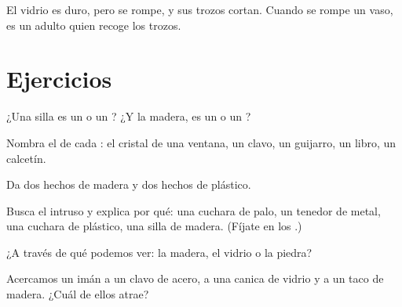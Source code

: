 \begin{remark}\label{rem:g1:materials-around-us:glass}
El vidrio es duro, pero se rompe, y sus trozos cortan. Cuando se rompe
un vaso, es un adulto quien recoge los trozos.
\end{remark}

\section{Ejercicios}

\begin{exercise}[$\star$]\label{exo:g1:materials-around-us:1}
¿Una silla es un  o un ? ¿Y la madera, es un  o un
?
\end{exercise}

\begin{exercise}[$\star$]\label{exo:g1:materials-around-us:2}
Nombra el  de cada : el cristal de una ventana, un clavo,
un guijarro, un libro, un calcetín.
\end{exercise}

\begin{exercise}[$\star$]\label{exo:g1:materials-around-us:3}
Da dos  hechos de madera y dos  hechos de plástico.
\end{exercise}

\begin{exercise}[$\star$]\label{exo:g1:materials-around-us:4}
Busca el intruso y explica por qué: una cuchara de palo, un tenedor de
metal, una cuchara de plástico, una silla de madera. (Fíjate en los
.)
\end{exercise}

\begin{exercise}[$\star$]\label{exo:g1:materials-around-us:5}
¿A través de qué  podemos ver: la madera, el vidrio o la
piedra?
\end{exercise}

\begin{exercise}[$\star$]\label{exo:g1:materials-around-us:6}
Acercamos un imán a un clavo de acero, a una canica de vidrio y a un
taco de madera. ¿Cuál de ellos atrae?
\end{exercise}

